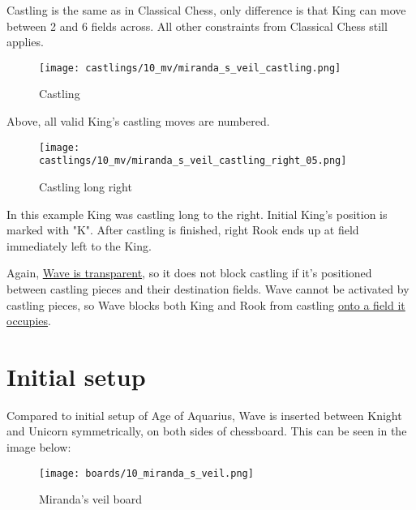 Castling is the same as in Classical Chess, only difference is that King can move between 2 and 6 fields across.
All other constraints from Classical Chess still applies.

\vspace*{-0.7\baselineskip}
\noindent
\begin{figure}[!h]
\texttt{[image: castlings/10\_mv/miranda\_s\_veil\_castling.png]}
\caption{Castling}
\label{fig:miranda_s_veil_castling}
\end{figure}

Above, all valid King's castling moves are numbered.

\vspace*{-0.7\baselineskip}
\noindent
\begin{figure}[!h]
\texttt{[image: castlings/10\_mv/miranda\_s\_veil\_castling\_right\_05.png]}
\caption{Castling long right}
\label{fig:miranda_s_veil_castling_right_05}
\end{figure}

In this example King was castling long to the right. Initial King's position is marked with "K".
After castling is finished, right Rook ends up at field immediately left to the King.

Again, \hyperref[fig:scn_mv_07_wave_is_transparent]{Wave is transparent}, so it does
not block castling if it's positioned between castling pieces and their destination
fields.
Wave cannot be activated by castling pieces, so Wave blocks both King and Rook from castling
\hyperref[fig:scn_mv_11_wave_block_castling_rook]{onto a field it occupies}.

\clearpage %

\section*{Initial setup}
\label{sec:Miranda's veil/Initial setup}

Compared to initial setup of Age of Aquarius, Wave is inserted between Knight and Unicorn
symmetrically, on both sides of chessboard. This can be seen in the image below:

\noindent
\begin{figure}[h]
\texttt{[image: boards/10\_miranda\_s\_veil.png]}
\caption{Miranda's veil board}
\label{fig:10_miranda_s_veil}
\end{figure}

\clearpage %
